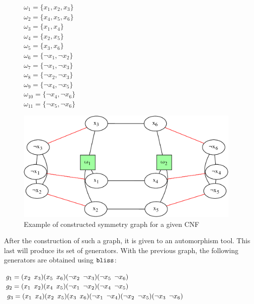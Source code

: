 \begin{figure}[!htbp]
 \begin{minipage}[r]{.2\textwidth}
   $\omega_{1} = \{ x_{1}, x_{2}, x_{3} \}$ \\
 $\omega_{2} = \{ x_{4}, x_{5}, x_{6} \}$ \\
 $\omega_{3} = \{ x_{1}, x_{4} \}$ \\
 $\omega_{4} = \{ x_{2}, x_{5} \}$ \\
 $\omega_{5} = \{ x_{3}, x_{6} \}$ \\
 $\omega_{6} = \{ \neg x_{1}, \neg x_{2} \}$ \\
 $\omega_{7} = \{ \neg x_{1}, \neg x_{3} \}$ \\
 $\omega_{8} = \{ \neg x_{2}, \neg x_{3} \}$ \\
 $\omega_{9} = \{ \neg x_{4}, \neg x_{5} \}$ \\
 $\omega_{10} = \{ \neg x_{4}, \neg x_{6} \}$ \\
 $\omega_{11} = \{ \neg x_{5}, \neg x_{6} \}$ \\
 \end{minipage}
 \begin{minipage}[r]{.75\textwidth}
  \includegraphics[width=4.3in]{cnfs/graph_cnf_opt-crop}
 \end{minipage}
 \caption{Example of constructed symmetry graph for a given CNF}
  \label{fig:graph_opt}
\end{figure}


After the construction of such a graph, it is given to an automorphism tool.
This last will produce its set of generators.
With the previous graph, the following generators are obtained using $\texttt{bliss}$:


\begin{center}
 \begin{minipage}[c]{.635\textwidth}
  $g_1 = (x_2 \enskip x_3)(x_5 \enskip x_6)(\neg x_2 \enskip \neg x_3)(\neg x_5 \enskip \neg x_6)$\\
  $g_2 = (x_1 \enskip x_2)(x_4 \enskip x_5)(\neg x_1 \enskip \neg x_2)(\neg x_4 \enskip \neg x_5)$\\
  $g_3 = (x_1 \enskip x_4)(x_2 \enskip x_5)(x_3 \enskip x_6)(\neg x_1 \enskip \neg x_4)(\neg x_2 \enskip \neg x_5)(\neg x_3 \enskip \neg x_6)$
 \end{minipage}
\end{center}

